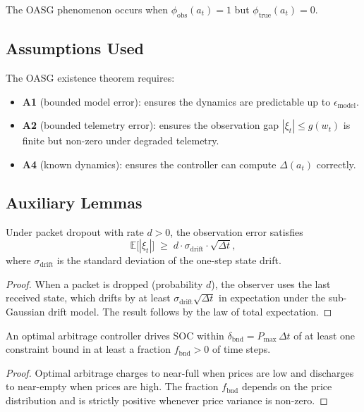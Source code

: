 The OASG phenomenon occurs when $\phi_{\text{obs}}(a_t) = 1$ but
$\phi_{\text{true}}(a_t) = 0$.

\subsection{Assumptions Used}

The OASG existence theorem requires:
\begin{itemize}
  \item \textbf{A1} (bounded model error): ensures the dynamics are
    predictable up to $\epsilon_{\text{model}}$.
  \item \textbf{A2} (bounded telemetry error): ensures the observation
    gap $|\xi_t| \le g(w_t)$ is finite but non-zero under degraded
    telemetry.
  \item \textbf{A4} (known dynamics): ensures the controller can compute
    $\Delta(a_t)$ correctly.
\end{itemize}

\subsection{Auxiliary Lemmas}

\begin{lemma}
\label{lem:obs-gap-dropout}
Under packet dropout with rate $d > 0$, the observation error satisfies
\[
  \mathbb{E}\bigl[|\xi_t|\bigr] \;\ge\; d \cdot \sigma_{\text{drift}} \cdot
  \sqrt{\Delta t},
\]
where $\sigma_{\text{drift}}$ is the standard deviation of the one-step
state drift.
\end{lemma}

\begin{proof}
When a packet is dropped (probability $d$), the observer uses the last
received state, which drifts by at least $\sigma_{\text{drift}}\sqrt{\Delta t}$
in expectation under the sub-Gaussian drift model.  The result follows
by the law of total expectation.
\end{proof}

\begin{lemma}
\label{lem:boundary-proximity}
An optimal arbitrage controller drives SOC within
$\delta_{\text{bnd}} = P_{\max}\,\Delta t$ of at least one constraint
bound in at least a fraction $f_{\text{bnd}} > 0$ of time steps.
\end{lemma}

\begin{proof}
Optimal arbitrage charges to near-full when prices are low and discharges
to near-empty when prices are high.  The fraction $f_{\text{bnd}}$
depends on the price distribution and is strictly positive whenever
price variance is non-zero.
\end{proof}

